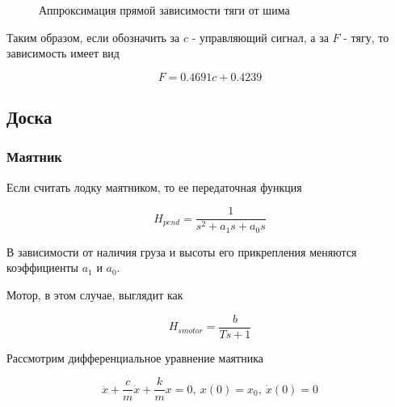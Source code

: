 \documentclass[12pt,a4paper]{article}
\begin{document}
\begin{figure}[h]
	\caption{Аппроксимация прямой зависимости тяги от шима}
	\label{thrust_on_pwm_plot}
\end{figure}

Таким образом, если обозначить за $c$ - управляющий сигнал, а за $F$ - тягу, то зависимость имеет вид

$$ F = 0.4691c + 0.4239 $$

\subsection{Доска}

\subsubsection{Маятник}

Если считать лодку маятником, то ее передаточная функция

$$ H_{pend} = \frac{1}{s^2 + a_1s + a_0s} $$

В зависимости от наличия груза и высоты его прикрепления меняются коэффициенты $a_1$ и $a_0$.

Мотор, в этом случае, выглядит как

$$ H_{smotor} = \frac{b}{Ts+1} $$

Рассмотрим дифференциальное уравнение маятника

\begin{equation}
	\label{pend_eq}
	\ddot{x} + \frac{c}{m}\dot{x} + \frac{k}{m}x = 0, \ x(0) = x_0, \ \dot{x}(0) = 0 
\end{equation}
\end{document}
